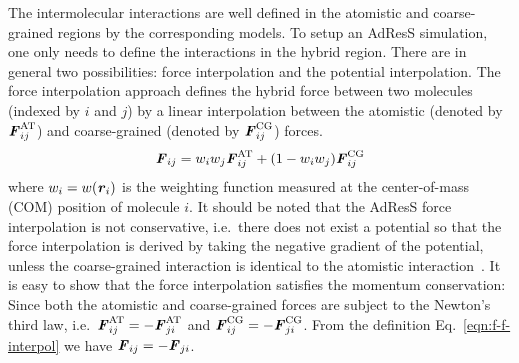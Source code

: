 \documentclass[epjST]{svjour}
\newcommand{\vect}[1]{\textbf{\textit{#1}}}
\newcommand{\AT}[0]{\textrm{AT}}
\newcommand{\CG}[0]{\textrm{CG}}
\newcommand{\moleidxone}[0]{i}
\newcommand{\moleidxtwo}[0]{j}
\begin{document}
The intermolecular interactions are
well defined in the atomistic and coarse-grained regions by the corresponding models.
To setup an AdResS simulation, one only needs to define the
interactions in the hybrid region. There are in general two
possibilities: force interpolation and the potential interpolation.
The force interpolation approach defines the hybrid force between two
molecules (indexed by $\moleidxone$ and $\moleidxtwo$) by a linear interpolation
between the atomistic (denoted by ${\vect F}_{\moleidxone\moleidxtwo}^{\AT}$) and coarse-grained (denoted by ${\vect F}_{\moleidxone\moleidxtwo}^{\CG}$) forces.
\begin{align}\label{eqn:f-f-interpol}
  {\vect F}_{\moleidxone \moleidxtwo}=w_\moleidxone w_\moleidxtwo{\vect F}_{\moleidxone\moleidxtwo}^{\AT}+(1-w_\moleidxone w_\moleidxtwo){\vect F}^{\CG}_{\moleidxone\moleidxtwo} 
\end{align}
where $w_\moleidxone = w(\vect r_\moleidxone)$ is the weighting function
measured at the center-of-mass (COM) position of molecule $\moleidxone$.
It should be noted that the AdResS  force interpolation is not conservative, i.e.~there does not
exist a potential so that the force interpolation is derived by taking the negative gradient of the potential,
unless the coarse-grained interaction is identical to the atomistic interaction~\cite{praprotnik2011comment,dellesite2007some}.
It is easy to show that the force interpolation satisfies the momentum conservation: Since
both the atomistic and coarse-grained forces are subject to the Newton's third law, i.e.~${\vect F}_{\moleidxone\moleidxtwo}^{\AT} = - {\vect F}_{\moleidxtwo\moleidxone}^{\AT}$
and ${\vect F}_{\moleidxone\moleidxtwo}^{\CG} = - {\vect F}_{\moleidxtwo\moleidxone}^{\CG}$. From the definition Eq.~\eqref{eqn:f-f-interpol} we have ${\vect F}_{\moleidxone\moleidxtwo} = - {\vect F}_{\moleidxtwo\moleidxone}$.
\end{document}
